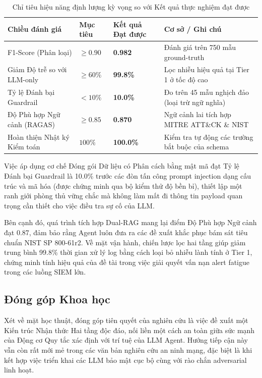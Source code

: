 \documentclass[12pt,a4paper]{article}
\begin{document}
\begin{table}[H]
    \centering
    \caption{Chỉ tiêu hiệu năng định lượng kỳ vọng so với Kết quả thực nghiệm đạt được}
    \label{tab:targets}
    \begin{tabular}{llll}
        \toprule
        \textbf{Chiều đánh giá}      & \textbf{Mục tiêu} & \textbf{Kết quả Đạt được} & \textbf{Cơ sở / Ghi chú}                          \\
        \midrule
        F1-Score (Phân loại)         & $\geq 0.90$       & \textbf{0.982}            & Đánh giá trên 750 mẫu ground-truth                \\
        Giảm Độ trễ so với LLM-only  & $\geq 60\%$       & \textbf{99.8\%}           & Lọc nhiễu hiệu quả tại Tier 1 ở tốc độ cao        \\
        Tỷ lệ Đánh bại Guardrail     & $< 10\%$          & \textbf{10.0\%}           & Đo trên 45 mẫu nghịch đảo (loại trừ ngữ nghĩa)    \\
        Độ Phù hợp Ngữ cảnh (RAGAS)  & $\geq 0.85$       & \textbf{0.870}            & Ngữ cảnh lai tích hợp MITRE ATT\&CK \& NIST       \\
        Hoàn thiện Nhật ký Kiểm toán & $100\%$           & \textbf{100.0\%}          & Kiểm tra tự động các trường bắt buộc của schema  \\
        \bottomrule
    \end{tabular}
\end{table}

Việc áp dụng cơ chế Đóng gói Dữ liệu có Phân cách bằng mật mã đạt Tỷ lệ Đánh bại Guardrail là 10.0\% trước các đòn tấn công prompt injection dạng cấu trúc và mã hóa (được chứng minh qua bộ kiểm thử độ bền bỉ), thiết lập một ranh giới phòng thủ vững chắc mà không làm mất đi thông tin payload quan trọng cần thiết cho việc điều tra sự cố của LLM.

Bên cạnh đó, quá trình tích hợp Dual-RAG mang lại điểm Độ Phù hợp Ngữ cảnh đạt 0.87, đảm bảo rằng Agent luôn đưa ra các đề xuất khắc phục bám sát tiêu chuẩn NIST SP 800-61r2. Về mặt vận hành, chiến lược lọc hai tầng giúp giảm trung bình 99.8\% thời gian xử lý log bằng cách loại bỏ nhiễu lành tính ở Tier 1, chứng minh tính hiệu quả của đề tài trong việc giải quyết vấn nạn alert fatigue trong các luồng SIEM lớn.

\subsection{Đóng góp Khoa học}
Xét về mặt học thuật, đóng góp tiên quyết của nghiên cứu là việc đề xuất một Kiến trúc Nhận thức Hai tầng độc đáo, nối liền một cách an toàn giữa sức mạnh của Động cơ Quy tắc xác định với trí tuệ của LLM Agent. Hướng tiếp cận này vẫn còn rất mới mẻ trong các văn bản nghiên cứu an ninh mạng, đặc biệt là khi kết hợp việc triển khai các LLM bảo mật cục bộ cùng với rào chắn adversarial linh hoạt.
\end{document}

